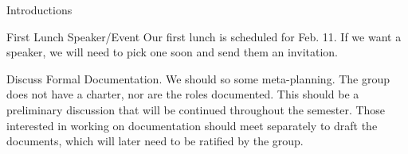 \documentclass{agenda}
\begin{document}


\agendaheader

\begin{agendaitem}{5}{Introductions}
\end{agendaitem}

\begin{agendaitem}[10]{First Lunch Speaker/Event}
  Our first lunch is scheduled for Feb. 11. If we want a speaker, we
  will need to pick one soon and send them an invitation.
\end{agendaitem}

\begin{agendaitem}{10}{Discuss Formal Documentation.}
    We should so some meta-planning. The group does not have a
    charter, nor are the roles documented. This should be a
    preliminary discussion that will be continued throughout the
    semester. Those interested in working on documentation should meet
    separately to draft the documents, which will later need to be
    ratified by the group.
\end{agendaitem}
\end{document}
